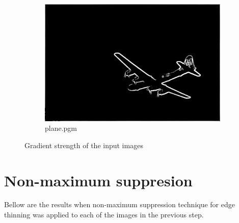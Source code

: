 \documentclass{article}
\begin{document}
\begin{figure}[!h]
  \begin{subfigure}{0.7\textwidth}
  \centering
    \includegraphics[width=\textwidth]{planesobel}
    \caption{plane.pgm}
    \label{fig:f2}
  \end{subfigure}
 \caption{Gradient strength of the input images}
\end{figure}


\vspace{.1pc}
\section{Non-maximum suppresion}

Bellow are the results when non-maximum suppression technique for edge thinning was applied to each of the images in the previous step. 
\end{document}
